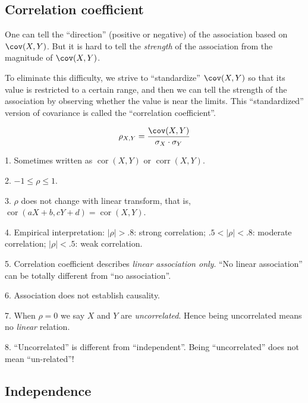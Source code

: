 \documentclass[12pt]{article}
\begin{document}
\subsection{Correlation coefficient}

One can tell the ``direction'' (positive or negative)
of the association based on $\cov(X, Y)$.
But
it is hard to tell the \emph{strength} of the association
from the magnitude of $\cov(X,Y)$.

To eliminate this difficulty,
we strive to ``standardize'' $\cov(X,Y)$ so that
its value is restricted to a certain range,
and then we can tell the strength of the association
by observing whether the value is near the limits.
This ``standardized'' version of covariance is called the ``correlation
coefficient''.

\[
\rho_{X,Y} = \frac{\cov(X,Y)}{\sigma_X \cdot \sigma_Y}
\]

\alert[Remarks]%
1. Sometimes written as $\operatorname{cor}(X,Y)$ or
    $\operatorname{corr}(X,Y)$.

2. $-1 \le \rho \le 1$.

3. $\rho$ does not change with linear transform, that is,
    $\operatorname{cor}(aX + b, cY + d) = \operatorname{cor}(X, Y)$.


4. Empirical interpretation:
    $|\rho| > .8$: strong correlation;
    $.5 < |\rho| < .8$: moderate correlation;
    $|\rho| < .5$: weak correlation.

5. Correlation coefficient describes \emph{linear association only}.
    ``No linear association'' can be totally different from
    ``no association''.

6. Association does not establish causality.

7. When $\rho = 0$ we say $X$ and $Y$ are \emph{uncorrelated}.
   Hence being uncorrelated means no \emph{linear} relation.

8. ``Uncorrelated'' is different from ``independent''.
    Being ``uncorrelated'' does not mean ``un-related''!


\subsection{Independence}
\end{document}

